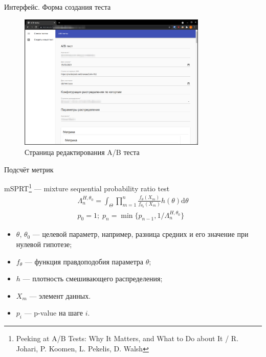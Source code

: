 \documentclass[12pt, unicode]{beamer}
\begin{document}
	\begin{frame}[fragile]{Интерфейс. Форма создания теста}
		\begin{figure}[h]
			\centering
			\includegraphics[width=0.8\textwidth]{edit_page.png}
			\caption{Страница редактирования A/B теста}
		\end{figure}
	\end{frame}
	
	
	\begin{frame}[fragile]{Подсчёт метрик}
		\begin{block}{mSPRT\footnote[1]{
					Peeking at A/B Tests: Why It Matters, and What to Do about It / R. Johari, P.
					Koomen, L. Pekelis, D. Walsh	
				} --- mixture sequential probability ratio test}
			\begin{equation}
				\begin{aligned}
					\Lambda_{n}^{H,\theta_0}=\int_{\Theta}\prod\limits_{m=1}^{n}\frac{f_{\theta}(X_m)}{f_{\theta_0}(X_m)}h(\theta)\mathrm{d}\theta\\
					p_0=1;\;p_n=\min\{p_{n-1},1/\Lambda_{n}^{H,\theta_0}\}
				\end{aligned}
			\end{equation}
			\vspace*{-0.5cm}
			\begin{itemize}
				\item $\theta$, $\theta_0$ --- целевой параметр, например, разница средних и его значение при нулевой гипотезе;
				\item $f_{\theta}$ --- функция правдоподобия параметра $\theta$;
				\item $h$ --- плотность смешивающего распределения;
				\item $X_m$ --- элемент данных.
				\item $p_i$ --- p-value на шаге $i$.
			\end{itemize}
			\vspace*{-0.5cm}
		\end{block}
		\vfill\null
	\end{frame}
\end{document}
